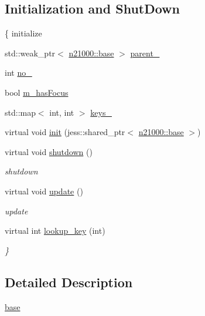 \subsection*{Initialization and ShutDown}
\label{_amgrp2a8ba145c14f2dcb11ba0fe271240078}
 \{ initialize \begin{DoxyCompactItemize}
\item 
std::weak\_\-ptr$<$ \hyperlink{classnebula_1_1platform_1_1platform_1_1base}{n21000::base} $>$ \hyperlink{classnebula_1_1platform_1_1window_1_1base_a209b92d0223e1c95a75b0c67fc1848e3}{parent\_\-}
\item 
int \hyperlink{classnebula_1_1platform_1_1window_1_1base_a682d823f868c56aa05bba627b5de7207}{no\_\-}
\item 
bool \hyperlink{classnebula_1_1platform_1_1window_1_1base_a642eb7607a4f3c3e86c133a581fe1eb5}{m\_\-hasFocus}
\item 
std::map$<$ int, int $>$ \hyperlink{classnebula_1_1platform_1_1window_1_1base_a40e3611e00f67c3f0b2c59ad8fb05547}{keys\_\-}
\item 
virtual void \hyperlink{classnebula_1_1platform_1_1window_1_1base_abd4bc47dc2a14a21885cc6df06c8ec43}{init} (jess::shared\_\-ptr$<$ \hyperlink{classnebula_1_1platform_1_1platform_1_1base}{n21000::base} $>$)
\item 
virtual void \hyperlink{classnebula_1_1platform_1_1window_1_1base_a656d35bf58a3c27a07117b68de3ff2f1}{shutdown} ()
\begin{DoxyCompactList}\small\item\em shutdown \item\end{DoxyCompactList}\item 
virtual void \hyperlink{classnebula_1_1platform_1_1window_1_1base_aac6186e43bad0446f303ced7e3593a3a}{update} ()
\begin{DoxyCompactList}\small\item\em update \item\end{DoxyCompactList}\item 
virtual int \hyperlink{classnebula_1_1platform_1_1window_1_1base_a9988c533e20319ce211ce20deab35cfa}{lookup\_\-key} (int)
\begin{DoxyCompactList}\small\item\em \} \item\end{DoxyCompactList}\end{DoxyCompactItemize}


\subsection{Detailed Description}
\hyperlink{classnebula_1_1platform_1_1window_1_1base}{base} 

